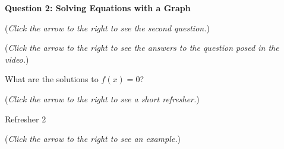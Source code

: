 \documentclass{ximera}
\begin{document}
\textbf{Question 2: Solving Equations with a Graph}
\begin{question}
\begin{flushright}
{\color{blue}(\emph{Click the arrow to the right to see the second question.})}
\end{flushright}
\begin{center}
\begin{expandable}
{\color{blue}(\emph{Click the arrow to the right to see the answers 
to the question posed in the video.})}
\begin{expandable}
What are the solutions to $f(x)=0$?
\begin{multipleChoice}
\end{multipleChoice}
\begin{flushright}
{\color{blue}(\emph{Click the arrow to the right to see a short refresher.})}
\end{flushright}
\begin{expandable}
Refresher 2
\end{expandable}
\begin{flushright}
{\color{blue}(\emph{Click the arrow to the right to see an example.})}
\end{flushright}
\begin{expandable}
\end{expandable}
\end{expandable}
\end{expandable}
\end{center}
\end{question}
\end{document}
